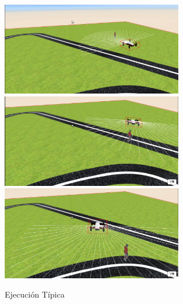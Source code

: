 \begin{figure}[H]
  \begin{center}
  \includegraphics[width=0.7\textwidth]{figures/simulado/comp_1.png}\hfill
  \includegraphics[width=0.7\textwidth]{figures/simulado/comp_2.png}\hfill
    \includegraphics[width=0.7\textwidth]{figures/simulado/comp_3.png}\hfill
		\caption{Ejecución Típica}
		\label{fig:ejecucion_sim}
		\end{center}
\end{figure}


